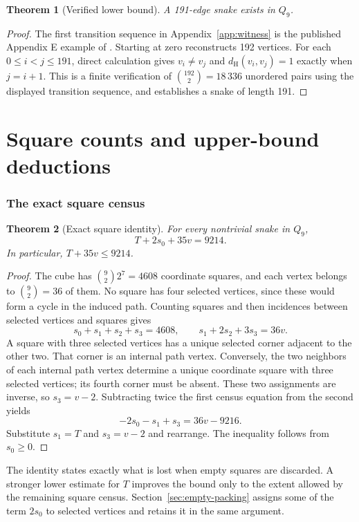 \documentclass[11pt,a4paper]{article}
\newtheorem{theorem}{Theorem}[section]
\theoremstyle{definition}
\theoremstyle{remark}
\newcommand{\Q}{Q}
\newcommand{\Ham}{d_{\mathrm H}}
\begin{document}
\begin{theorem}[Verified lower bound]\label{thm:lower}
A 191-edge snake exists in $\Q_9$.
\end{theorem}
\begin{proof}
The first transition sequence in Appendix~\ref{app:witness} is the published Appendix E example of \cite{orland}. Starting at zero reconstructs 192 vertices. For each $0\le i<j\le191$, direct calculation gives $v_i\ne v_j$ and $\Ham(v_i,v_j)=1$ exactly when $j=i+1$. This is a finite verification of $\binom{192}{2}=18\,336$ unordered pairs using the displayed transition sequence, and establishes a snake of length 191.
\end{proof}

\part{Square counts and upper-bound deductions}
\section{The exact square census}\label{sec:incidence}
\begin{theorem}[Exact square identity]\label{thm:exact-square}
For every nontrivial snake in $\Q_9$,
\begin{equation}\label{eq:exact-square}
T+2s_0+35v=9214.
\end{equation}
In particular, $T+35v\le9214$.
\end{theorem}
\begin{proof}
The cube has $\binom92 2^7=4608$ coordinate squares, and each vertex belongs to $\binom92=36$ of them. No square has four selected vertices, since these would form a cycle in the induced path. Counting squares and then incidences between selected vertices and squares gives
\[
s_0+s_1+s_2+s_3=4608,\qquad s_1+2s_2+3s_3=36v.
\]
A square with three selected vertices has a unique selected corner adjacent to the other two. That corner is an internal path vertex. Conversely, the two neighbors of each internal path vertex determine a unique coordinate square with three selected vertices; its fourth corner must be absent. These two assignments are inverse, so $s_3=v-2$. Subtracting twice the first census equation from the second yields
\[
-2s_0-s_1+s_3=36v-9216.
\]
Substitute $s_1=T$ and $s_3=v-2$ and rearrange. The inequality follows from $s_0\ge0$.
\end{proof}

The identity states exactly what is lost when empty squares are discarded. A stronger lower estimate for $T$ improves the bound only to the extent allowed by the remaining square census. Section~\ref{sec:empty-packing} assigns some of the term $2s_0$ to selected vertices and retains it in the same argument.
\end{document}
